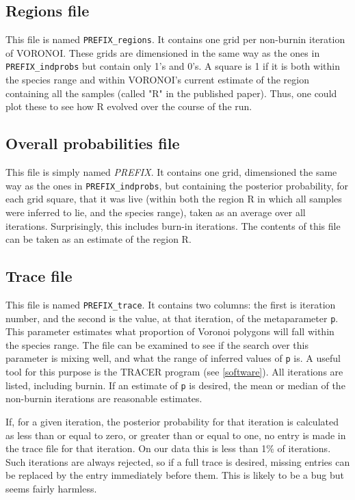 \documentclass[10pt,titlepage,times,letterpaper]{article}
\begin{document}
\subsection{Regions file}

This file is named {\tt PREFIX\_regions}.  It contains one grid per non-burnin
iteration of VORONOI.  These grids are dimensioned in the same way as the ones in
{\tt PREFIX\_indprobs} but contain only 1's and 0's.  A square is 1 if it is both within
the species range and within VORONOI's current estimate of the region containing all
the samples (called "R" in the published paper).  Thus, one could plot these to see how 
R evolved over the course of the run.

\subsection{Overall probabilities file}

This file is simply named {\it PREFIX}.  It contains one grid, dimensioned the same
way as the ones in {\tt PREFIX\_indprobs}, but containing the posterior probability, for
each grid square, that it was live (within both the region R in which all samples were
inferred to lie, and the species range), taken as an average over all iterations.  
Surprisingly, this includes burn-in iterations.  The contents of this file can be taken
as an estimate of the region R.  

\subsection{Trace file}

This file is named {\tt PREFIX\_trace}.  It contains two columns:  the first is iteration
number, and the second is the value, at that iteration, of the metaparameter {\tt p}.
This parameter estimates what proportion of Voronoi polygons will fall within the
species range.  The file can be examined to see if the search over this parameter is
mixing well, and what the range of inferred values of {\tt p} is.  A useful tool
for this purpose is the TRACER program (see \ref{software}).  All iterations are
listed, including burnin.  If an estimate of {\tt p} is desired, the mean or median of
the non-burnin iterations are reasonable estimates.

If, for a given iteration, the posterior probability for that iteration is calculated
as less than or equal to zero, or greater than or equal to one, no entry is made in the trace 
file for that iteration.
On our data this is less than 1\% of iterations.  Such iterations
are always rejected, so if a full trace is desired, missing entries can be replaced by
the entry immediately before them.  This is likely to be a bug but seems fairly
harmless.
\end{document}
